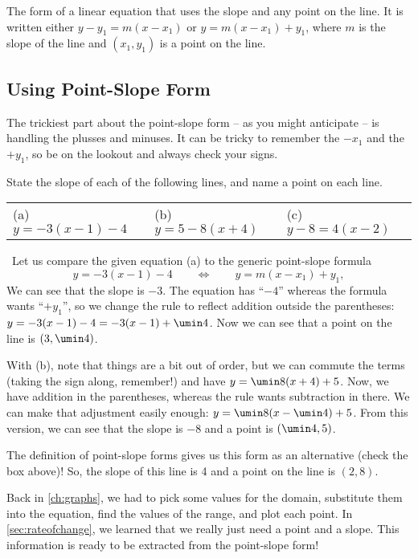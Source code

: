 \begin{boxeddef}
The form of a linear equation that uses the slope and any point on the line. It is written either $y-y_1 = m(x-x_1)$ or $y=m(x-x_1)+y_1$, where $m$ is the slope of the line and $(x_1,y_1)$ is a point on the line.
\end{boxeddef}

\subsection{Using Point-Slope Form}

The trickiest part about the point-slope form -- as you might anticipate -- is handling the plusses and minuses. It can be tricky to remember the $-x_1$ and the $+y_1$, so be on the lookout and always check your signs.

\begin{boxedex}
State the slope of each of the following lines, and name a point on each line.

\begin{center}
\begin{tabularx}{0.8\textwidth}{XXX}
(a)~ $y=-3(x-1)-4$
&
(b)~ $y=5-8(x+4)$
&
(c)~ $y-8=4(x-2)$
\end{tabularx}
\end{center}

\exsoln\ Let us compare the given equation (a) to the generic point-slope formula \[y=-3(x-1)-4 \qquad\iff\qquad y=m(x-x_1)+y_1,\] 
We can see that the slope is $-3$. The equation has ``$-4$'' whereas the formula wants ``$+y_1$'', so we change the rule to reflect addition outside the parentheses: $y=-3(x-1)-4 = -3(x-1)+\umin4$. Now we can see that a point on the line is $(3,\umin4)$.

With (b), note that things are a bit out of order, but we can commute the terms (taking the sign along, remember!) and have $y=\umin8(x+4)+5$. Now, we have addition in the parentheses, whereas the rule wants subtraction in there. We can make that adjustment easily enough: $y=\umin8(x-\umin4)+5$. From this version, we can see that the slope is $-8$ and a point is $(\umin4,5)$.

The definition of point-slope forms gives us this form as an alternative (check the box above)! So, the slope of this line is 4 and a point on the line is $(2,8)$.
\end{boxedex}

Back in \cref{ch:graphs}, we had to pick some values for the domain, substitute them into the equation, find the values of the range, and plot each point. In \cref{sec:rateofchange}, we learned that we really just need a point and a slope. This information is ready to be extracted from the point-slope form!

